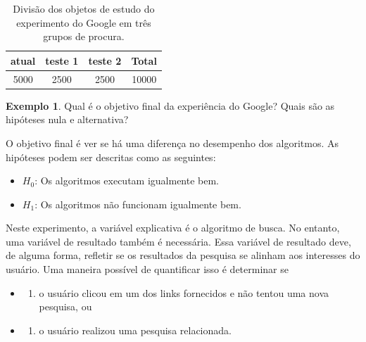 \documentclass[
]{book}
\providecommand{\tightlist}{%
  \setlength{\itemsep}{0pt}\setlength{\parskip}{0pt}}
\theoremstyle{definition}
\theoremstyle{definition}
\newtheorem{example}{Exemplo}[chapter]
\theoremstyle{definition}
\theoremstyle{definition}
\theoremstyle{remark}
\begin{document}
\begin{table}

\caption{\label{tab:googleSearchAlgorithmByAlgorithmOnly}Divisão dos objetos de estudo do experimento do Google em três grupos de procura.}
\centering
\begin{tabular}[t]{c|c|c|c}
\hline
atual & teste 1 & teste 2 & Total\\
\hline
5000 & 2500 & 2500 & 10000\\
\hline
\end{tabular}
\end{table}

\begin{example}
\protect\hypertarget{exm:unnamed-chunk-251}{}{\label{exm:unnamed-chunk-251} }Qual é o objetivo final da experiência do Google? Quais são as hipóteses nula e alternativa?
\end{example}

O objetivo final é ver se há uma diferença no desempenho dos algoritmos. As hipóteses podem ser descritas como as seguintes:

\begin{itemize}
\item
  \(H_0\): Os algoritmos executam igualmente bem.
\item
  \(H_1\): Os algoritmos não funcionam igualmente bem.
\end{itemize}

Neste experimento, a variável explicativa é o algoritmo de busca. No entanto, uma variável de resultado também é necessária. Essa variável de resultado deve, de alguma forma, refletir se os resultados da pesquisa se alinham aos interesses do usuário. Uma maneira possível de quantificar isso é determinar se

\begin{itemize}
\item
  \begin{enumerate}
  \def\labelenumi{(\arabic{enumi})}
  \tightlist
  \item
    o usuário clicou em um dos links fornecidos e não tentou uma nova pesquisa, ou
  \end{enumerate}
\item
  \begin{enumerate}
  \def\labelenumi{(\arabic{enumi})}
  \setcounter{enumi}{1}
  \tightlist
  \item
    o usuário realizou uma pesquisa relacionada.
  \end{enumerate}
\end{itemize}
\end{document}
